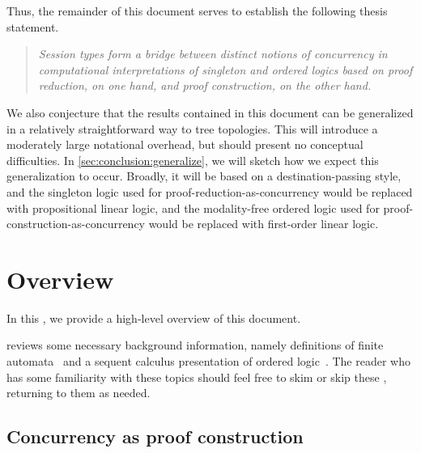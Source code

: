 Thus, the remainder of this document serves to establish the following thesis statement.
\begin{quotation}
  \normalsize
  \itshape Session types form a bridge between distinct notions of concurrency in computational interpretations of singleton and ordered logics based on proof reduction, on one hand, and proof construction, on the other hand.
\end{quotation}

We also conjecture that the results contained in this document can be generalized in a relatively straightforward way to tree topologies.
This will introduce a moderately large notational overhead, but should present no conceptual difficulties.
In \cref{sec:conclusion:generalize}, we will sketch how we expect this generalization to occur.
Broadly, it will be based on a destination-passing style\autocite{Pfenning+Simmons:HOSC11}, and the singleton logic used for proof-reduction-as-concurrency would be replaced with propositional linear logic, and the modality-free ordered logic used for proof-construction-as-concurrency would be replaced with first-order linear logic.

\section{Overview}\label{sec:introduction:overview}

In this , we provide a high-level overview of this document.

 reviews some necessary background information, namely definitions of finite automata~ and a sequent calculus presentation of ordered logic\autocite{Polakow+Pfenning:MFPS99}~.
The reader who has some familiarity with these topics should feel free to skim or skip these , returning to them as needed.

\subsection{Concurrency as proof construction}

